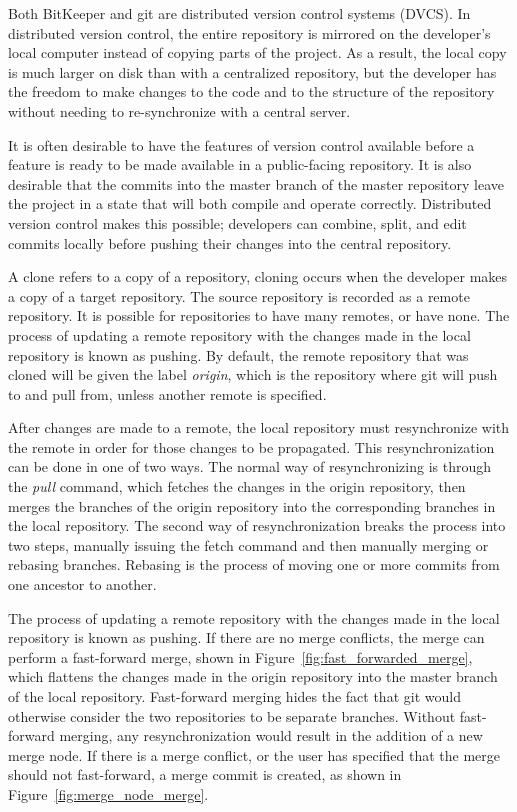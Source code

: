 Both BitKeeper and git are distributed version control systems (DVCS).
In distributed version control, the entire repository is mirrored on
the developer's local computer instead of copying parts of the project.
As a result, the local copy is much larger on disk than with a
centralized repository, but the developer has the freedom to make
changes to the code and to the
structure of the repository without needing to re-synchronize with a
central server.

It is often desirable to have the features of version control available
before a feature is ready to be made available in a public-facing
repository.
It is also desirable that the commits into the master branch of the
master repository leave the project in a state that will both compile
and operate correctly.
Distributed version control makes this possible; developers can combine,
split, and edit commits locally before pushing their changes into the
central repository.

A clone refers to a copy of a repository, cloning occurs when the
developer makes a copy of a target repository.
The source repository is recorded as a remote repository.
It is possible for repositories to have many remotes, or have none.
The process of updating a remote repository with the changes made in the
local repository is known as pushing.
By default, the remote repository that was cloned will be given the
label \textit{origin}, which is the repository where git will push to
and pull from, unless another remote is specified.

After changes are made to a remote, the local repository must
resynchronize with the remote in order for those changes to be
propagated.
This resynchronization can be done in one of two ways.
The normal way of resynchronizing is through the \textit{pull} command,
which fetches the changes in the origin repository, then merges the
branches of the origin repository into the corresponding branches in the
local repository.
The second way of resynchronization breaks the process into two steps,
manually issuing the fetch command and then manually merging or rebasing
branches.
Rebasing is the process of moving one or more commits from one ancestor
to another.

The process of updating a remote repository with the changes made in
the local repository is known as pushing.
If there are no merge conflicts, the merge can perform a fast-forward
merge, shown in Figure~\ref{fig:fast_forwarded_merge},
which flattens the changes made in the origin repository into the
master branch of the local repository.
Fast-forward merging hides the fact that git would otherwise consider
the two repositories to be separate branches.
Without fast-forward merging, any resynchronization would result in the
addition of a new merge node.
If there is a merge conflict, or the user has specified that the merge
should not fast-forward, a merge commit is created, as shown in
Figure~\ref{fig:merge_node_merge}.

